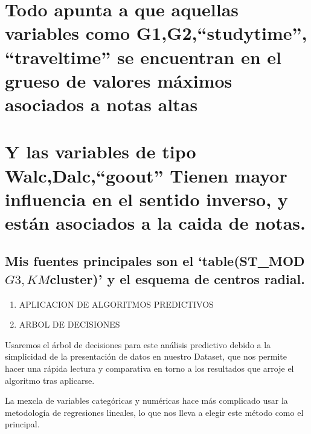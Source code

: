 \documentclass[]{article}
\begin{document}
\section{\texorpdfstring{Todo apunta a que aquellas variables como
G1,G2,``studytime'', ``traveltime'' se encuentran en el grueso de
valores máximos asociados a notas
altas}{Todo apunta a que aquellas variables como G1,G2,studytime, traveltime se encuentran en el grueso de valores máximos asociados a notas altas}}\label{todo-apunta-a-que-aquellas-variables-como-g1g2studytime-traveltime-se-encuentran-en-el-grueso-de-valores-maximos-asociados-a-notas-altas}

\section{\texorpdfstring{Y las variables de tipo Walc,Dalc,``goout''
Tienen mayor influencia en el sentido inverso, y están asociados a la
caida de
notas.}{Y las variables de tipo Walc,Dalc,goout Tienen mayor influencia en el sentido inverso, y están asociados a la caida de notas.}}\label{y-las-variables-de-tipo-walcdalcgoout-tienen-mayor-influencia-en-el-sentido-inverso-y-estan-asociados-a-la-caida-de-notas.}

\subsection{\texorpdfstring{Mis fuentes principales son el
`table(ST\_MOD\(G3, KM\)cluster)' y el esquema de centros
radial.}{Mis fuentes principales son el table(ST\_MODG3, KMcluster) y el esquema de centros radial.}}\label{mis-fuentes-principales-son-el-tablest_modg3-kmcluster-y-el-esquema-de-centros-radial.}

\begin{enumerate}
\def\labelenumi{\arabic{enumi}.}
\setcounter{enumi}{5}
\item
  APLICACION DE ALGORITMOS PREDICTIVOS
\item
  ARBOL DE DECISIONES
\end{enumerate}

Usaremos el árbol de decisiones para este análisis predictivo debido a
la simplicidad de la presentación de datos en nuestro Dataset, que nos
permite hacer una rápida lectura y comparativa en torno a los resultados
que arroje el algoritmo tras aplicarse.

La mexcla de variables categóricas y numéricas hace más complicado usar
la metodología de regresiones lineales, lo que nos lleva a elegir este
método como el principal.
\end{document}
